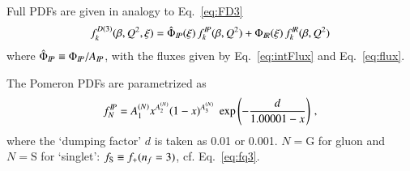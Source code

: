 Full PDFs are given in analogy to Eq.~\ref{eq:FD3}
\begin{equation}
f_k^{D(3)}(\beta,Q^2,\xi) =
\hat\Phi_{I\!P}(\xi)\, f^{I\!P}_k(\beta,Q^2)
+
\Phi_{I\!R}(\xi)\, f^{I\!R}_k(\beta,Q^2)
\end{equation}
where $\hat\Phi_{I\!P} \equiv \Phi_{I\!P}/A_{I\!P}$,
with the fluxes given by Eq.~\ref{eq:intFlux} and Eq.~\ref{eq:flux}.

The Pomeron PDFs are parametrized as
\def\Cini#1#2{A^{(#1)}_#2}
\begin{equation}
\label{eq:fP0}
f^\Pom_N = \Cini N1  x^{\Cini N2} (1-x)^{\Cini N3}
  \; \exp\left(-\frac{d}{1.00001-x}\right)
\,,
\end{equation}
where the `dumping factor' $d$ is taken as 0.01 or 0.001.
$N = \mathrm G$ for gluon and $N = \mathrm S$ for `singlet': $f_{\rm S} \equiv f_+(n_f=3)$,
cf. Eq.~\ref{eq:fq3}.










